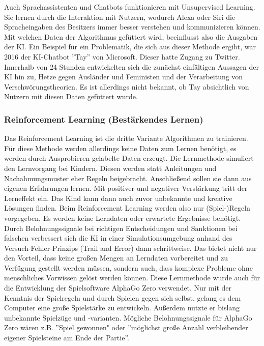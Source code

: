 \documentclass[a4paper,12pt, german]{report}
\begin{document}
Auch Sprachassistenten und Chatbots funktionieren mit Unsupervised Learning. Sie lernen durch die Interaktion mit Nutzern, wodurch Alexa oder Siri die Spracheingaben des Besitzers immer besser verstehen und kommunizieren können. Mit welchen Daten der Algorithmus gefüttert wird, beeinflusst also die Ausgaben der KI. Ein Beispiel für ein Problematik, die sich aus dieser Methode ergibt, war 2016 der KI-Chatbot ''Tay'' von Microsoft. Dieser hatte Zugang zu Twitter. Innerhalb von 24 Stunden entwickelten sich die zunächst einfältigen Aussagen der KI hin zu, Hetze gegen Ausländer und Feministen und der Verarbeitung von Verschwörungstheorien. Es ist allerdings nicht bekannt, ob Tay absichtlich von Nutzern mit diesen Daten gefüttert wurde.\cite{13}

\subsubsection{Reinforcement Learning (Bestärkendes Lernen)} 

Das Reinforcement Learning ist die dritte Variante Algorithmen zu trainieren. Für diese Methode werden allerdings keine Daten zum Lernen benötigt, es werden durch Ausprobieren gelabelte Daten erzeugt.\cite{17} \newline
Die Lernmethode simuliert den Lernvorgang bei Kindern. Diesen werden statt Anleitungen und Nachahmungsmuster eher Regeln beigebracht. Anschließend sollen sie dann aus eigenen Erfahrungen lernen. Mit positiver und negativer Verstärkung tritt der Lerneffekt ein. Das Kind kann dann auch zuvor unbekannte und kreative Lösungen finden.
Beim Reinforcement Learning werden also nur (Spiel-)Regeln vorgegeben. Es werden keine Lerndaten oder erwartete Ergebnisse benötigt. Durch Belohnungssignale bei richtigen Entscheidungen und Sanktionen bei falschen verbessert sich die KI in einer Simulationsumgebung anhand des Versuch-Fehler-Prinzips (Trail and Error) dann schrittweise. Das bietet nicht nur den Vorteil, dass keine großen Mengen an Lerndaten vorbereitet und zu Verfügung gestellt werden müssen, sondern auch, dass komplexe Probleme ohne menschliches Vorwissen gelöst werden können.\cite{02}
\newline
Diese Lernmethode wurde auch für die Entwicklung der Spielsoftware AlphaGo Zero verwendet. Nur mit der Kenntnis der Spielregeln und durch Spielen gegen sich selbst, gelang es dem Computer eine große Spielstärke zu entwickeln. Außerdem nutzte er bislang unbekannte Spielzüge und -varianten. Mögliche Belohnungssignale für AlphaGo Zero wären z.B. ''Spiel gewonnen" oder ''möglichst große Anzahl verbleibender eigener Spielsteine am Ende der Partie''. \cite{02}
\end{document}
